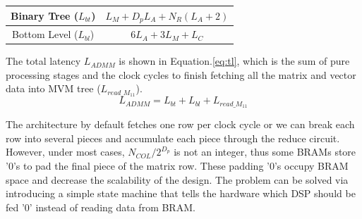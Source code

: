 \begin{center}
\label{tab:lat}
\begin{tabular}{ c|c } 
 \hline
 Binary Tree ($L_{bt}$)& $L_M+D_pL_A+N_R(L_A+2)$\\ 
\hline
 Bottom Level ($L_{bl}$)& $6L_A+3L_M+L_C$\\ 
 \hline
\end{tabular}
\end{center}

%
%

The total latency $L_{ADMM}$ is shown in Equation.\cref{eq:tl}, which is the sum of pure processing stages and the clock cycles to finish fetching all the matrix and vector data into MVM tree ($L_{read\_ M_{11}}$). 
\begin{equation}
\label{eq:tl}
L_{ADMM}=L_{bt}+L_{bl}+L_{read\_ M_{11}}
\end{equation}

The architecture by default fetches one row per clock cycle or we can break each row into several pieces and accumulate each piece through the reduce circuit. However, under most cases, $N_{COL}/2^{D_p}$ is not an integer, thus some BRAMs store '0's to pad the final piece of the matrix row. These padding '0's occupy BRAM space and decrease the scalability of the design. The problem can be solved via introducing a simple state machine that tells the hardware which DSP should be fed '0' instead of reading data from BRAM.

